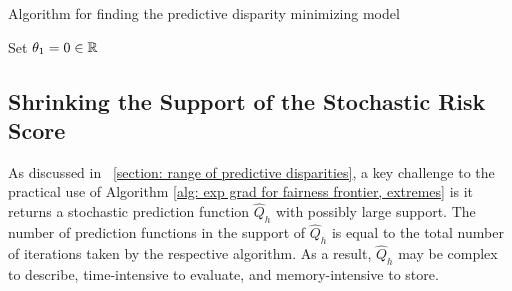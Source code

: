 \documentclass{article}
\begin{document}
\begin{algorithm}[hb!]
\SetAlgoLined
\caption{Algorithm for finding the predictive disparity minimizing model}
\label{alg: exp grad for fairness frontier, extremes}
Set $\theta_1 = 0 \in \mathbb{R}$ \;
\end{algorithm}

\subsection{Shrinking the Support of the Stochastic Risk Score}\label{section: linear program reduction}

As discussed in \textsection~\ref{section: range of predictive disparities}, a key challenge to the practical use of Algorithm \ref{alg: exp grad for fairness frontier, extremes} is it returns a stochastic prediction function $\hat{Q}_h$ with possibly large support. The number of prediction functions in the support of $\hat{Q}_h$ is equal to the total number of iterations taken by the respective algorithm. As a result, $\hat{Q}_h$ may be complex to describe, time-intensive to evaluate, and memory-intensive to store.
\end{document}
